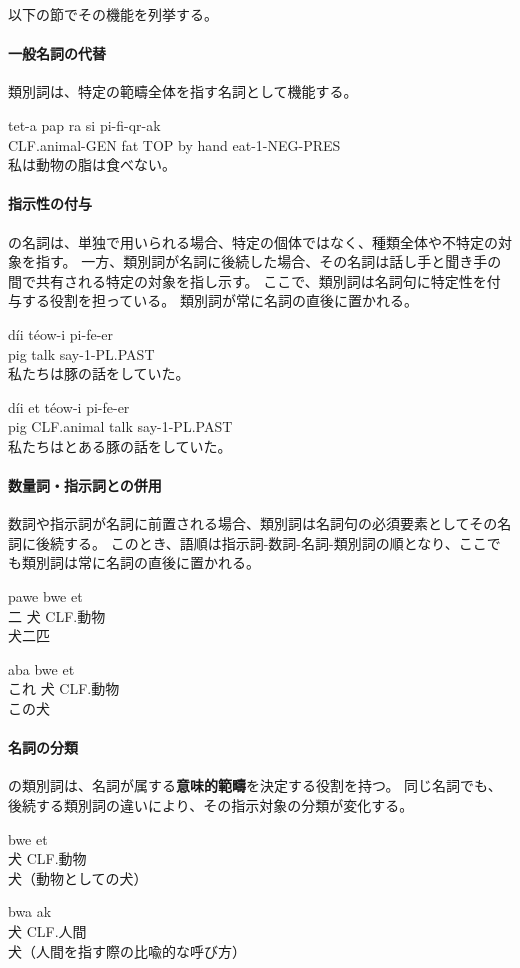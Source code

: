 以下の節でその機能を列挙する。

\paragraph{一般名詞の代替}
類別詞は、特定の範疇全体を指す名詞として機能する。
\begin{exe}
\ex \gll tet-a pap ra si pi-fi-qr-ak\\
        CLF.animal-GEN fat TOP by hand eat-1-NEG-PRES\\
\glt 私は動物の脂は食べない。
\end{exe}

\paragraph{指示性の付与}

\langname の名詞は、単独で用いられる場合、特定の個体ではなく、種類全体や不特定の対象を指す。
一方、類別詞が名詞に後続した場合、その名詞は話し手と聞き手の間で共有される特定の対象を指し示す。
ここで、類別詞は名詞句に特定性を付与する役割を担っている。
類別詞が常に名詞の直後に置かれる。
\begin{exe}
\ex \gll d\'ii t\'eow-i pi-fe-er\\
pig talk say-1-PL.PAST \\
\glt 私たちは豚の話をしていた。
\end{exe}
\begin{exe}
\ex \gll d\'ii et t\'eow-i pi-fe-er\\
pig CLF.animal talk say-1-PL.PAST \\
\glt 私たちはとある豚の話をしていた。
\end{exe}

\paragraph{数量詞・指示詞との併用}

数詞や指示詞が名詞に前置される場合、類別詞は名詞句の必須要素としてその名詞に後続する。
このとき、語順は指示詞-数詞-名詞-類別詞の順となり、ここでも類別詞は常に名詞の直後に置かれる。
\begin{exe}
\ex \gll pawe bwe et\\
二 犬 CLF.動物\\
\glt 犬二匹
\end{exe}
\begin{exe}
\ex \gll aba bwe et\\
これ 犬 CLF.動物\\
\glt この犬
\end{exe}


\paragraph{名詞の分類}

\langname の類別詞は、名詞が属する\textbf{意味的範疇}を決定する役割を持つ。
同じ名詞でも、後続する類別詞の違いにより、その指示対象の分類が変化する。
\begin{exe}
\ex \gll bwe et\\
犬 CLF.動物\\
\glt 犬（動物としての犬）
\end{exe}
\begin{exe}
\ex \gll bwa ak\\
犬 CLF.人間\\
\glt 犬（人間を指す際の比喩的な呼び方）
\end{exe}